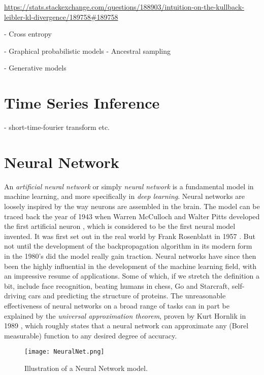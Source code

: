 \documentclass[../../thesis.tex]{subfiles}
\begin{document}
\url{https://stats.stackexchange.com/questions/188903/intuition-on-the-kullback-leibler-kl-divergence/189758#189758}

- Cross entropy 

- Graphical probabilistic models 
    - Ancestral sampling

- Generative models


\section{Time Series Inference}
- short-time-fourier transform etc.

\section{Neural Network}
An \textit{artificial neural network} or simply \textit{neural network} is a fundamental model in machine learning, and more specifically in \textit{deep learning}. Neural networks are loosely inspired by the way neurons are assembled in the brain. The model can be traced back the year of 1943 when Warren McCulloch and Walter Pitts developed the first artificial neuron \cite{MCCULLOCH199099}, which is considered to be the first neural model invented. It was first set out in the real world by Frank Rosenblatt in 1957 \cite{rosenblatt1957perceptron}. But not until the development of the backpropagation algorithm in its modern form in the 1980's did the model really gain traction. Neural networks have since then been the highly influential in the development of the machine learning field, with an impressive resume of applications. Some of which, if we stretch the definition a bit, include face recognition, beating humans in chess, Go and Starcraft, self-driving cars and predicting the structure of proteins. The unreasonable effectiveness of neural networks on a broad range of tasks can in part be explained by the \textit{universal approximation theorem}, proven by Kurt Hornlik in 1989 \cite{HORNIK1989359}, which roughly states that a neural network can approximate any (Borel measurable) function to any desired degree of accuracy. 

\begin{figure}
    \texttt{[image: NeuralNet.png]}
    \centering 
    \caption{Illustration of a Neural Network model.}
    \label{fig:NeuralNet}
\end{figure}
\end{document}
